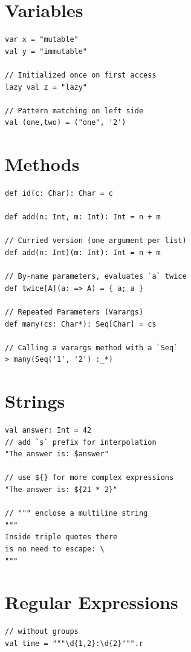 \documentclass[10pt,landscape,a4paper]{article}
\begin{document}

\small
\begin{multicols*}{4}

  \section{Variables}
\begin{verbatim}
var x = "mutable"
val y = "immutable"

// Initialized once on first access
lazy val z = "lazy"

// Pattern matching on left side
val (one,two) = ("one", '2')
\end{verbatim}

  \section{Methods}
\begin{verbatim}
def id(c: Char): Char = c

def add(n: Int, m: Int): Int = n + m

// Curried version (one argument per list)
def add(n: Int)(m: Int): Int = n + m

// By-name parameters, evaluates `a` twice
def twice[A](a: => A) = { a; a }

// Repeated Parameters (Varargs)
def many(cs: Char*): Seq[Char] = cs

// Calling a varargs method with a `Seq`
> many(Seq('1', '2') :_*)
\end{verbatim}

  \section{Strings}

\begin{verbatim}
val answer: Int = 42
// add `s` prefix for interpolation
"The answer is: $answer"

// use ${} for more complex expressions
"The answer is: ${21 * 2}"

// """ enclose a multiline string
"""
Inside triple quotes there
is no need to escape: \
"""
\end{verbatim}

  \section{Regular Expressions}

\begin{verbatim}
// without groups
val time = """\d{1,2}:\d{2}""".r


\end{verbatim}
\end{multicols*}
\end{document}
